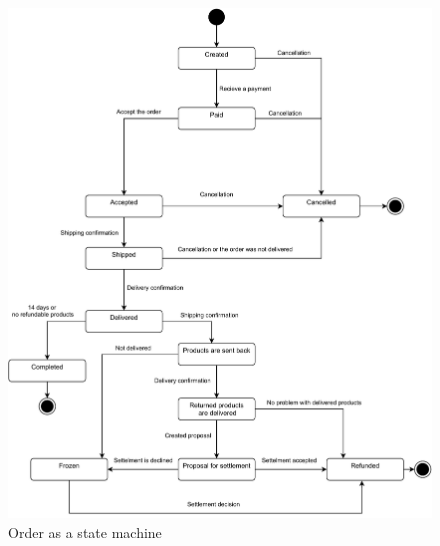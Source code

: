 \documentclass[thesis=M,english]{FITthesis}[2019/12/23]
\begin{document}
\begin{figure}[ht!]
    \centering
    \includegraphics[width=\textwidth]{assets/OrderStateMachine2.pdf}
    \caption{Order as a state machine}
    \label{fig:orderStateMachine}
\end{figure}
\end{document}
